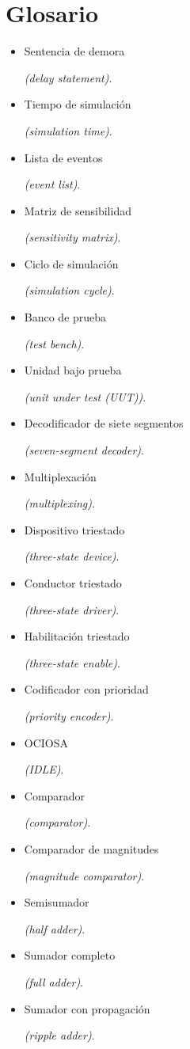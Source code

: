 \section{Glosario}

\begin{itemize}
    \item \hypertarget{delay_statement}{Sentencia de demora} \emph{(delay statement)}.
    \item \hypertarget{simulation_time}{Tiempo de simulación} \emph{(simulation time)}.
    \item \hypertarget{event_list}{Lista de eventos} \emph{(event list)}.
    \item \hypertarget{sensitivity_matrix}{Matriz de sensibilidad} \emph{(sensitivity matrix)}.
    \item \hypertarget{simulation_cycle}{Ciclo de simulación} \emph{(simulation cycle)}.
    \item \hypertarget{test_bench}{Banco de prueba} \emph{(test bench)}.
    \item \hypertarget{unit_under_test}{Unidad bajo prueba} \emph{(unit under test (UUT))}.
    \item \hypertarget{seven-segment_decoder}{Decodificador de siete segmentos} \emph{(seven-segment decoder)}.
    \item \hypertarget{multiplexing}{Multiplexación} \emph{(multiplexing)}.
    \item \hypertarget{threestate_device}{Dispositivo triestado} \emph{(three-state device)}.
    \item \hypertarget{threestate_driver}{Conductor triestado} \emph{(three-state driver)}.
    \item \hypertarget{threestate_enable}{Habilitación triestado} \emph{(three-state enable)}.
    \item \hypertarget{priority_encoder}{Codificador con prioridad} \emph{(priority encoder)}.
    \item \hypertarget{IDLE}{OCIOSA} \emph{(IDLE)}.
    \item \hypertarget{comparator}{Comparador} \emph{(comparator)}.
    \item \hypertarget{magnitude_comparator}{Comparador de magnitudes} \emph{(magnitude comparator)}.
    \item \hypertarget{half_adder}{Semisumador} \emph{(half adder)}.
    \item \hypertarget{full_adder}{Sumador completo} \emph{(full adder)}.
    \item \hypertarget{ripple_adder}{Sumador con propagación} \emph{(ripple adder)}.

\end{itemize}
